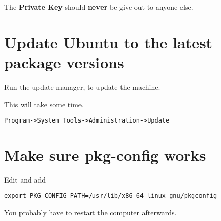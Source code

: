 The {\bf Private Key} should {\bf never} be give out to anyone else.

\section{Update Ubuntu to the latest package versions}




Run the update manager, to update the machine.

This will take some time.


\begin{verbatim}
Program->System Tools->Administration->Update
\end{verbatim}

\section{Make sure pkg-config works}

Edit  and add

\begin{verbatim}
export PKG_CONFIG_PATH=/usr/lib/x86_64-linux-gnu/pkgconfig
\end{verbatim}



You probably have to restart the computer afterwards.

